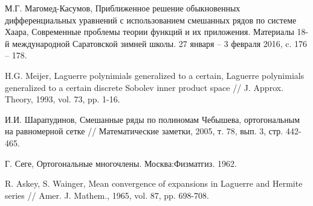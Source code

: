 \begin{thebibliography}{999}
М.Г. Магомед-Касумов,
Приближенное решение обыкновенных дифференциальных уравнений с использованием смешанных рядов по системе Хаара,
Современные проблемы теории функций и их приложения. Материалы 18-й международной Саратовской зимней школы.  27 января -- 3 февраля 2016, c. 176 -- 178.



 H.G. Meijer, Laguerre polynimials generalized to a certain,  Laguerre polynimials generalized to a certain discrete Sobolev inner product space // J. Approx. Theory, 1993, vol. 73, pp. 1-16.


 И.И. Шарапудинов, Смешанные ряды по полиномам Чебышева, ортогональным на равномерной сетке // Математические заметки, 2005, т. 78, вып. 3, стр. 442-465.


 Г. Сеге, Ортогональные многочлены. Москва:Физматгиз. 1962.


 R. Askey, S. Wainger, Mean convergence of expansions in Laguerre and Hermite series // Amer. J. Mathem., 1965, vol. 87, pp. 698-708.

%
%

%
%

%
%

%
%

%
%

%
%

%
%


\end{thebibliography}
